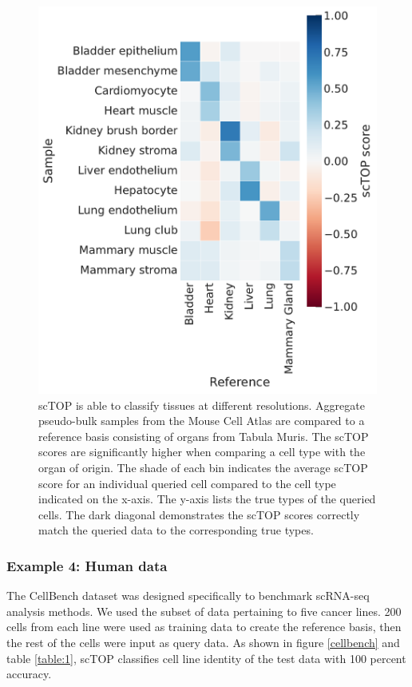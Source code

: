 \documentclass[aps,superscriptaddress, notitlepage,longbibliography]{revtex4-1}
\begin{document}
\begin{figure}
	\centering
    \includegraphics[scale=0.5]{figs/tabula muris heatmap.pdf}
	\caption{scTOP is able to classify tissues at different resolutions. Aggregate pseudo-bulk samples from the Mouse Cell Atlas are compared to a reference basis consisting of organs from Tabula Muris. The scTOP scores are significantly higher when comparing a cell type with the organ of origin. The shade of each bin indicates the average scTOP score for an individual queried cell compared to the cell type indicated on the x-axis. The y-axis lists the true types of the queried cells. The dark diagonal demonstrates the scTOP scores correctly match the queried data to the corresponding true types.}
	\label{tabula_muris}
\end{figure}

\subsubsection{Example 4:  Human data}

The CellBench dataset \cite{tian_benchmarking_2019} was designed specifically to benchmark scRNA-seq analysis methods. We used the subset of data pertaining to five cancer lines. 200 cells from each line were used as training data to create the reference basis, then the rest of the cells were input as query data. As shown in figure \ref{cellbench} and table \ref{table:1}, scTOP classifies cell line identity of the test data with 100 percent accuracy. 
\end{document}
